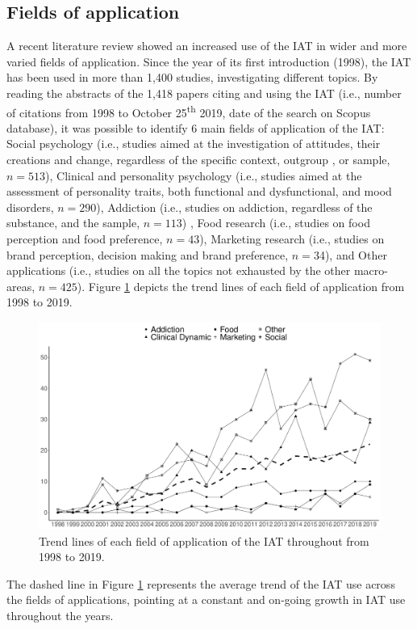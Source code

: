 \documentclass[12pt]{book}
\begin{document}
\subsection{Fields of application}

A recent literature review \cite{Epifania2020} showed an increased use of the IAT in wider and more varied fields of application.
Since the year of its first introduction (1998), the IAT has been used in more than 1,400 studies, investigating different topics. By reading the abstracts of the 1,418 papers citing and using the IAT (i.e., number of citations from 1998 to October 25\textsuperscript{th} 2019, date of the search on Scopus database), it was possible to identify 6 main fields of application of the IAT: Social psychology (i.e., studies aimed at the investigation of attitudes, their creations and change, regardless of the specific context, outgroup , or sample, $n = 513$), Clinical and personality psychology (i.e., studies aimed at the assessment of personality traits, both functional and dysfunctional, and mood disorders, $n = 290$), Addiction (i.e., studies on addiction, regardless of the substance, and the sample, $n = 113$) , Food research (i.e., studies on food perception and food preference, $n = 43$), Marketing research (i.e., studies on brand perception, decision making and brand preference, $n = $34), and Other applications (i.e., studies on all the topics not exhausted by the other macro-areas, $n = 425$). 
Figure \ref{fig:topicyear} depicts the trend lines of  each field of application from 1998 to 2019. 
\begin{figure}[!h]
	\centering
	\includegraphics[width=\linewidth]{yearIATtopic.pdf}
	\caption{\label{fig:topicyear} Trend lines of each field of application of the IAT throughout from 1998 to 2019. }
\end{figure}
The dashed line in Figure \ref{fig:topicyear} represents the average trend of the IAT use across the fields of applications, pointing at a constant and on-going growth in IAT use throughout the years. 
\end{document}

